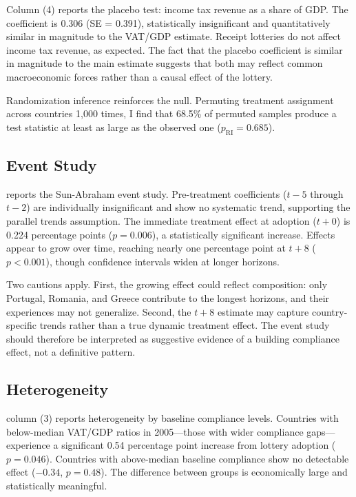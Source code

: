 \documentclass[12pt]{article}
\begin{document}
Column (4) reports the placebo test: income tax revenue as a share of GDP. The coefficient is 0.306 (SE = 0.391), statistically insignificant and quantitatively similar in magnitude to the VAT/GDP estimate. Receipt lotteries do not affect income tax revenue, as expected. The fact that the placebo coefficient is similar in magnitude to the main estimate suggests that both may reflect common macroeconomic forces rather than a causal effect of the lottery.

Randomization inference reinforces the null. Permuting treatment assignment across countries 1,000 times, I find that 68.5\% of permuted samples produce a test statistic at least as large as the observed one ($p_{\text{RI}} = 0.685$).

\subsection{Event Study}



 reports the Sun-Abraham event study. Pre-treatment coefficients ($t-5$ through $t-2$) are individually insignificant and show no systematic trend, supporting the parallel trends assumption. The immediate treatment effect at adoption ($t + 0$) is 0.224 percentage points ($p = 0.006$), a statistically significant increase. Effects appear to grow over time, reaching nearly one percentage point at $t + 8$ ($p < 0.001$), though confidence intervals widen at longer horizons.

Two cautions apply. First, the growing effect could reflect composition: only Portugal, Romania, and Greece contribute to the longest horizons, and their experiences may not generalize. Second, the $t + 8$ estimate may capture country-specific trends rather than a true dynamic treatment effect. The event study should therefore be interpreted as suggestive evidence of a building compliance effect, not a definitive pattern.

\subsection{Heterogeneity}



 column (3) reports heterogeneity by baseline compliance levels. Countries with below-median VAT/GDP ratios in 2005---those with wider compliance gaps---experience a significant 0.54 percentage point increase from lottery adoption ($p = 0.046$). Countries with above-median baseline compliance show no detectable effect ($-0.34$, $p = 0.48$). The difference between groups is economically large and statistically meaningful.
\end{document}
